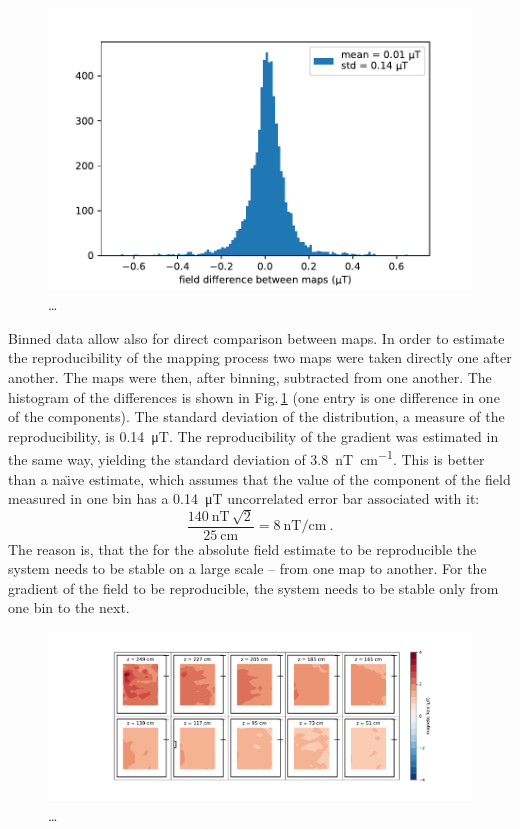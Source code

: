 \begin{figure}
  \centering
  \includegraphics[width=0.8\linewidth]{gfx/mapping/lpsc/reproducibility_field.pdf}
  \caption{\ldots}\label{fig:mapping_bastille_reproducibility}
\end{figure}

Binned data allow also for direct comparison between maps. In order to estimate the reproducibility of the mapping process two maps were taken directly one after another. The maps were then, after binning, subtracted from one another. The histogram of the differences is shown in Fig.\,\ref{fig:mapping_bastille_reproducibility} (one entry is one difference in one of the components). The standard deviation of the distribution, a measure of the reproducibility, is \SI{0.14}{\micro\tesla}. The reproducibility of the gradient was estimated in the same way, yielding the standard deviation of \SI[per-mode=symbol]{3.8}{\nano\tesla\per\centi\meter}. This is better than a na\"{\i}ve estimate, which assumes that the value of the component of the field measured in one bin has a \SI{0.14}{\micro\tesla} uncorrelated error bar associated with it:
\begin{equation}
  \frac{\SI{140}{\nano\tesla} \, \sqrt{2}}{\SI{25}{\centi\meter}} = \SI[per-mode=symbol]{8}{\nano\tesla\per\centi\meter} \ .
\end{equation}
The reason is, that the for the absolute field estimate to be reproducible the system needs to be stable on a large scale -- from one map to another. For the gradient of the field to be reproducible, the system needs to be stable only from one bin to the next.

\begin{figure}
  \centering
  \includegraphics[width=\linewidth]{gfx/mapping/lpsc/bastille_crane_change_magnitude.pdf}
  \caption{\ldots}
  \label{fig:mapping_bastille_crane_change}
\end{figure}

